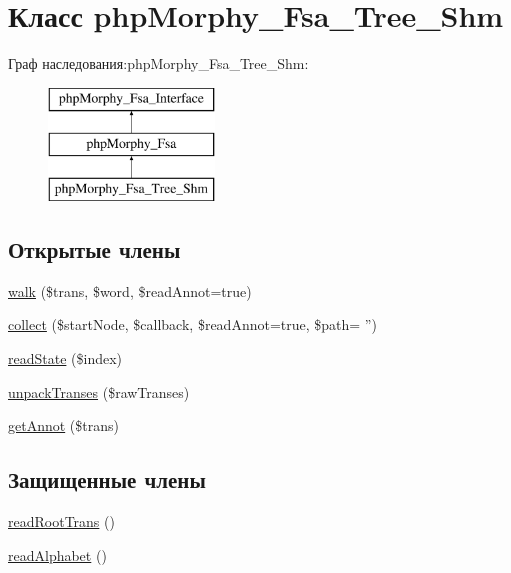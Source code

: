 \hypertarget{classphpMorphy__Fsa__Tree__Shm}{
\section{Класс phpMorphy\_\-Fsa\_\-Tree\_\-Shm}
\label{classphpMorphy__Fsa__Tree__Shm}
}
Граф наследования:phpMorphy\_\-Fsa\_\-Tree\_\-Shm:\begin{figure}[H]
\begin{center}
\leavevmode
\includegraphics[height=3.000000cm]{classphpMorphy__Fsa__Tree__Shm}
\end{center}
\end{figure}
\subsection*{Открытые члены}
\begin{DoxyCompactItemize}
\item 
\hyperlink{classphpMorphy__Fsa__Tree__Shm_abf846ead411f058f082ee84ffc16a154}{walk} (\$trans, \$word, \$readAnnot=true)
\item 
\hyperlink{classphpMorphy__Fsa__Tree__Shm_a8eaeb4a54d5f5f1dec19189e72e741b0}{collect} (\$startNode, \$callback, \$readAnnot=true, \$path= '')
\item 
\hyperlink{classphpMorphy__Fsa__Tree__Shm_a30f23df9502c79e270655efede407fc3}{readState} (\$index)
\item 
\hyperlink{classphpMorphy__Fsa__Tree__Shm_aeb0360191d49a35a7550e65c28a55636}{unpackTranses} (\$rawTranses)
\item 
\hyperlink{classphpMorphy__Fsa__Tree__Shm_a595257015feb1778ce0a33005f3f6ed2}{getAnnot} (\$trans)
\end{DoxyCompactItemize}
\subsection*{Защищенные члены}
\begin{DoxyCompactItemize}
\item 
\hyperlink{classphpMorphy__Fsa__Tree__Shm_a60476891a44dfb1231f7a3f329d0f232}{readRootTrans} ()
\item 
\hyperlink{classphpMorphy__Fsa__Tree__Shm_aaf82b48d16544d2d6f1ddfa841945247}{readAlphabet} ()
\end{DoxyCompactItemize}


